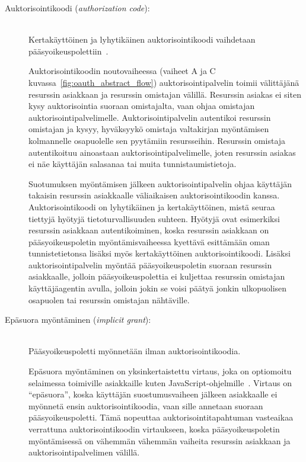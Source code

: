 \documentclass[finnish,gradu]{tktltiki}
\begin{document}
  \begin{description}
  \item[Auktorisointikoodi (\emph{authorization code}):] \hfill \\
  Kertakäyttöinen ja lyhytikäinen auktorisointikoodi vaihdetaan pääsyoikeuspolettiin~\cite{ietf_oauth2}.

  Auktorisointikoodin noutovaiheessa (vaiheet A ja C kuvassa~\ref{fig:oauth_abstract_flow}) auktorisointipalvelin toimii välittäjänä resurssin asiakkaan ja resurssin omistajan välillä. Resurssin asiakas ei siten kysy auktorisointia suoraan omistajalta, vaan ohjaa omistajan auktorisointipalvelimelle. Auktorisointipalvelin autentikoi resurssin omistajan ja kysyy, hyväksyykö omistaja valtakirjan myöntämisen kolmannelle osapuolelle sen pyytämiin resursseihin. Resurssin omistaja autentikoituu ainoastaan auktorisointipalvelimelle, joten resurssin asiakas ei näe käyttäjän salasanaa tai muita tunnistaumistietoja.

  Suotumuksen myöntämisen jälkeen auktorisointipalvelin ohjaa käyttäjän takaisin resurssin asiakkaalle väliaikaisen auktorisointikoodin kanssa. Auktorisointikoodi on lyhytikäinen ja kertakäyttöinen, mistä seuraa tiettyjä hyötyjä tietoturvallisuuden suhteen. Hyötyjä ovat esimerkiksi resurssin asiakkaan autentikoiminen, koska resurssin asiakkaan on pääsyoikeuspoletin myöntämisvaiheessa kyettävä esittämään oman tunnistetietonsa lisäksi myös kertakäyttöinen auktorisointikoodi. Lisäksi auktorisointipalvelin myöntää pääsyoikeuspoletin suoraan resurssin asiakkaalle, jolloin pääsyoikeuspolettia ei kuljettaa resurssin omistajan käyttäjäagentin avulla, jolloin jokin se voisi päätyä jonkin ulkopuolisen osapuolen tai resurssin omistajan nähtäville.

  \item[Epäsuora myöntäminen (\emph{implicit grant}):] \hfill \\
  Pääsyoikeuspoletti myönnetään ilman auktorisointikoodia.

  Epäsuora myöntäminen on yksinkertaistettu virtaus, joka on optiomoitu selaimessa toimiville asiakkaille kuten JavaScript-ohjelmille~\cite{ietf_oauth2}. Virtaus on ``epäsuora'', koska käyttäjän suostumusvaiheen jälkeen asiakkaalle ei myönnetä ensin auktorisointikoodia, vaan sille annetaan suoraan pääsyoikeuspoletti. Tämä nopeuttaa auktorisointitapahtuman vasteaikaa verrattuna auktorisointikoodin virtaukseen, koska pääsyoikeuspoletin myöntämisessä on vähemmän vähemmän vaiheita resurssin asiakkaan ja auktorisointipalvelimen välillä.


\end{description}
\end{document}
